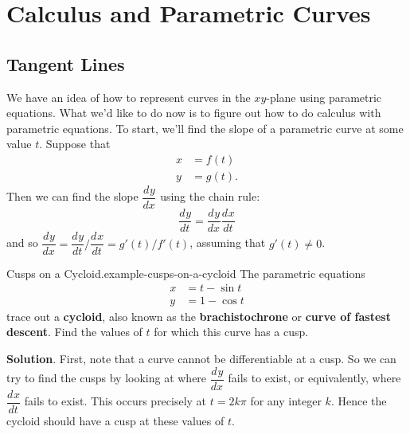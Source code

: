 \documentclass[10pt,]{book}
\newcommand{\terminology}[1]{\textbf{#1}}
\numberwithin{equation}{section}
\newcommand{\dv}[3][]{\dfrac{d^{#1} #2}{d #3^{#1}}}
\newcommand{\amp}{&}
\begin{document}
\section[{Calculus and Parametric Curves}]{Calculus and Parametric Curves}\label{section-calculus-and-parametric-curves}
%
%
\typeout{************************************************}
\typeout{************************************************}
%
\subsection[{Tangent Lines}]{Tangent Lines}\label{subsection-tangent-lines}
\hypertarget{p-1004}{}%
We have an idea of how to represent curves in the \(xy\)-plane using parametric equations. What we'd like to do now is to figure out how to do calculus with parametric equations. To start, we'll find the slope of a parametric curve at some value \(t\). Suppose that%
\begin{align*}
x \amp = f(t) \\
y \amp = g(t) \text{.}
\end{align*}
Then we can find the slope \(\dv{y}{x}\) using the chain rule:%
\begin{equation*}
\dv{y}{t} = \dv{y}{x}\dv{x}{t}
\end{equation*}
and so \(\dv{y}{x} = \dv{y}{t}/\dv{x}{t} = g'(t)/f'(t)\), assuming that \(g'(t)\neq0\).%
\begin{example}{Cusps on a Cycloid.}{example-cusps-on-a-cycloid}%
\hypertarget{p-1005}{}%
The parametric equations%
\begin{align*}
x \amp = t - \sin t \\
y \amp = 1 - \cos t 
\end{align*}
trace out a \terminology{cycloid}, also known as the \terminology{brachistochrone} or \terminology{curve of fastest descent}. Find the values of \(t\) for which this curve has a cusp.%
\par\smallskip%
\noindent\textbf{Solution}.\hypertarget{solution-203}{}\quad%
\hypertarget{p-1006}{}%
First, note that a curve cannot be differentiable at a cusp. So we can try to find the cusps by looking at where \(\dv{y}{x}\) fails to exist, or equivalently, where \(\dv{x}{t}\) fails to exist. This occurs precisely at \(t = 2k\pi\) for any integer \(k\). Hence the cycloid should have a cusp at these values of \(t\).%
\end{example}
%
%
\typeout{************************************************}
\typeout{************************************************}
%
\end{document}
